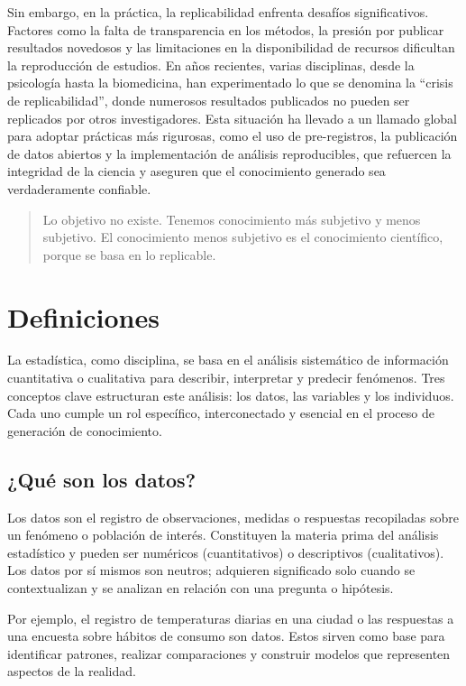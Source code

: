 \documentclass[
  letterpaper,
  DIV=11,
  numbers=noendperiod]{scrreprt}
\begin{document}
Sin embargo, en la práctica, la replicabilidad enfrenta desafíos
significativos. Factores como la falta de transparencia en los métodos,
la presión por publicar resultados novedosos y las limitaciones en la
disponibilidad de recursos dificultan la reproducción de estudios. En
años recientes, varias disciplinas, desde la psicología hasta la
biomedicina, han experimentado lo que se denomina la ``crisis de
replicabilidad'', donde numerosos resultados publicados no pueden ser
replicados por otros investigadores. Esta situación ha llevado a un
llamado global para adoptar prácticas más rigurosas, como el uso de
pre-registros, la publicación de datos abiertos y la implementación de
análisis reproducibles, que refuercen la integridad de la ciencia y
aseguren que el conocimiento generado sea verdaderamente confiable.

\begin{quote}
Lo objetivo no existe. Tenemos conocimiento más subjetivo y menos
subjetivo. El conocimiento menos subjetivo es el conocimiento
científico, porque se basa en lo replicable.
\end{quote}

\section{Definiciones}\label{definiciones}

La estadística, como disciplina, se basa en el análisis sistemático de
información cuantitativa o cualitativa para describir, interpretar y
predecir fenómenos. Tres conceptos clave estructuran este análisis: los
datos, las variables y los individuos. Cada uno cumple un rol
específico, interconectado y esencial en el proceso de generación de
conocimiento.

\subsection{¿Qué son los datos?}\label{quuxe9-son-los-datos}

Los datos son el registro de observaciones, medidas o respuestas
recopiladas sobre un fenómeno o población de interés. Constituyen la
materia prima del análisis estadístico y pueden ser numéricos
(cuantitativos) o descriptivos (cualitativos). Los datos por sí mismos
son neutros; adquieren significado solo cuando se contextualizan y se
analizan en relación con una pregunta o hipótesis.

Por ejemplo, el registro de temperaturas diarias en una ciudad o las
respuestas a una encuesta sobre hábitos de consumo son datos. Estos
sirven como base para identificar patrones, realizar comparaciones y
construir modelos que representen aspectos de la realidad.
\end{document}

